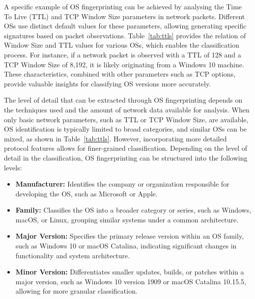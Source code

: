 A specific example of OS fingerprinting can be achieved by analysing the Time To Live (TTL) and TCP Window Size parameters in network packets. Different OSs use distinct default values for these parameters, allowing generating specific signatures based on packet observations. Table~\ref{tab:ttls} provides the relation of Window Size and TTL values for various OSs, which enables the classification process. For instance, if a network packet is observed with a TTL of 128 and a TCP Window Size of 8,192, it is likely originating from a Windows 10 machine. These characteristics, combined with other parameters such as TCP options, provide valuable insights for classifying OS versions more accurately.

The level of detail that can be extracted through OS fingerprinting depends on the techniques used and the amount of network data available for analysis. When only basic network parameters, such as TTL or TCP Window Size, are available, OS identification is typically limited to broad categories, and similar OSs can be mixed, as shown in Table~\ref{tab:ttls}. However, incorporating more detailed protocol features allows for finer-grained classification. Depending on the level of detail in the classification, OS fingerprinting can be structured into the following levels:

\begin{itemize}
    \item \textbf{Manufacturer:} Identifies the company or organization responsible for developing the OS, such as Microsoft or Apple.
    \item \textbf{Family:} Classifies the OS into a broader category or series, such as Windows, macOS, or Linux, grouping similar systems under a common architecture.
    \item \textbf{Major Version:} Specifies the primary release version within an OS family, such as Windows 10 or macOS Catalina, indicating significant changes in functionality and system architecture.
    \item \textbf{Minor Version:} Differentiates smaller updates, builds, or patches within a major version, such as Windows 10 version 1909 or macOS Catalina 10.15.5, allowing for more granular classification.
\end{itemize}

